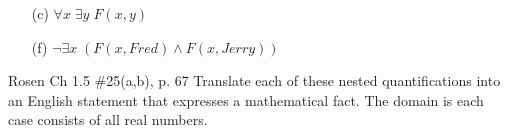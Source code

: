 \documentclass[12pt,addpoints]{exam}
\newcommand{\ra}{\rightarrow}
\begin{document}
\begin{questions}
\begin{solution}
\begin{itemize}
        \item[(c)] $\forall x\; \exists y\; F(x,y)$
        \item[(f)] $\neg \exists x\; (F(x, Fred) \wedge F(x,Jerry))$
    \end{itemize}
    \end{solution}
    
\question Rosen Ch 1.5 \#25(a,b), p. 67
Translate each of these nested quantifications into an English statement that expresses a mathematical fact.  The domain is each case consists of all real numbers. 
    \begin{solution}
    \end{solution}
    

\end{questions}
\end{document}
